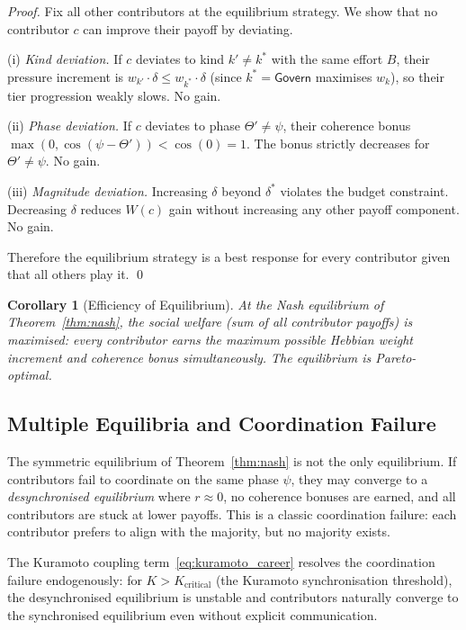 \documentclass[12pt]{article}
\newtheorem{corollary}[theorem]{Corollary}
\newcommand{\contrib}[1]{\mathsf{#1}}
\begin{document}
\begin{proof}
  Fix all other contributors at the equilibrium strategy.  We show that no
  contributor $c$ can improve their payoff by deviating.

  (i) \emph{Kind deviation.}  If $c$ deviates to kind $k' \ne k^*$ with the
  same effort $B$, their pressure increment is $w_{k'} \cdot \delta \le w_{k^*}
  \cdot \delta$ (since $k^* = \contrib{Govern}$ maximises $w_k$), so their tier
  progression weakly slows.  No gain.

  (ii) \emph{Phase deviation.}  If $c$ deviates to phase $\Theta' \ne \psi$,
  their coherence bonus $\max(0, \cos(\psi - \Theta')) < \cos(0) = 1$.  The
  bonus strictly decreases for $\Theta' \ne \psi$.  No gain.

  (iii) \emph{Magnitude deviation.}  Increasing $\delta$ beyond $\delta^*$
  violates the budget constraint.  Decreasing $\delta$ reduces $W(c)$ gain
  without increasing any other payoff component.  No gain.

  Therefore the equilibrium strategy is a best response for every contributor
  given that all others play it.  \qed
\end{proof}

\begin{corollary}[Efficiency of Equilibrium]
  At the Nash equilibrium of Theorem~\ref{thm:nash}, the social welfare
  (sum of all contributor payoffs) is maximised: every contributor earns the
  maximum possible Hebbian weight increment and coherence bonus simultaneously.
  The equilibrium is Pareto-optimal.
\end{corollary}

\subsection{Multiple Equilibria and Coordination Failure}

The symmetric equilibrium of Theorem~\ref{thm:nash} is not the only equilibrium.
If contributors fail to coordinate on the same phase $\psi$, they may converge
to a \emph{desynchronised equilibrium} where $r \approx 0$, no coherence bonuses
are earned, and all contributors are stuck at lower payoffs.  This is a classic
coordination failure: each contributor prefers to align with the majority, but
no majority exists.

The Kuramoto coupling term~\eqref{eq:kuramoto_career} resolves the coordination
failure endogenously: for $K > K_\text{critical}$ (the Kuramoto synchronisation
threshold), the desynchronised equilibrium is unstable and contributors
naturally converge to the synchronised equilibrium even without explicit
communication.
\end{document}
